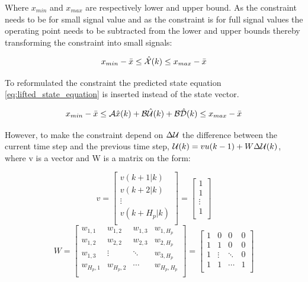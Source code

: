 Where $x_{min}$ and $x_{max}$ are respectively lower and upper bound. As the constraint needs to be for small signal value and as the constraint is for full signal values the operating point needs to be subtracted from the lower and upper bounds thereby transforming the constraint into small signals:

\begin{equation}
    x_{min}- \bar{x} \leq \hat{\CMcal{X}}(k) \leq x_{max}-\bar{x}
\end{equation}

To reformulated the constraint the predicted state equation \ref{eq:lifted_state_equation} is inserted instead of the state vector.

\begin{equation}
	x_{min}- \bar{x} \leq \CMcal{A}\hat{x}(k)+\CMcal{B}\hat{\CMcal{U}}(k)+\CMcal{B\hat{D}}(k) \leq x_{max}-\bar{x}
 \end{equation} 

However, to make the constraint depend on $\Delta \CMcal{U}$ the difference between the current time step and the previous time step, $\CMcal{U}(k) = vu(k-1) +W\Delta \CMcal{U}(k) $, where v is a vector and W is a matrix on the form: 

\begin{equation}
v=
	\begin{bmatrix}
	  v(k+1|k) 	\\
	  v(k+2|k) 	\\
	  \vdots 			\\
	  v(k+H_p|k) 	\\
	  \end{bmatrix}
	  = 
	  \begin{bmatrix}
	  1 	\\
	  1 	\\
	  \vdots 			\\
	  1 	\\
	  \end{bmatrix}
\end{equation}
\begin{equation}
	W=	  
\begin{bmatrix}
	  w_{1,1}  & w_{1,2} & w_{1,3} & w_{1,H_p} 	\\
	  w_{1,2}  & w_{2,2} & w_{2,3} & w_{2,H_p} 	\\
	  w_{1,3}  & \vdots & \ddots & w_{3,H_p}		\\
	  w_{H_p,1} & w_{H_p,2} & \cdots & w_{H_p,H_p} 	\\
	  \end{bmatrix}=
	  \begin{bmatrix}
	  1 & 0 & 0 & 0 	\\
	  1 & 1 & 0 & 0 	\\
	  1 & \vdots & \ddots & 0		\\
	  1 & 1 & \cdots & 1 	\\
	  \end{bmatrix}
\end{equation}


